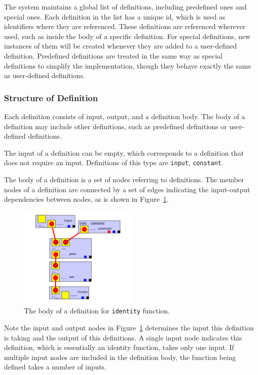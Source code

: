 \documentclass[12pt,UTF8,a4]{article}
\begin{document}
The system maintains a global list of definitions, including predefined ones and special ones. Each definition in the list has a unique id, which is used as identifiers where they are referenced. These definitions are referenced wherever used, such as inside the body of a specific definition. For special definitions, new instances of them will be created whenever they are added to a user-defined definition. Predefined definitions are treated in the same way as special definitions to simplify the implementation, though they behave exactly the same as user-defined definitions.

\subsubsection{Structure of Definition}
Each definition consists of input, output, and a definition body. The body of a definition may include other definitions, such as predefined definitions or user-defined definitions.

The input of a definition can be empty, which corresponds to a definition that does not require an input. Definitions of this type are \texttt{input}, \texttt{constant}.

The body of a definition is a set of nodes referring to definitions. The member nodes of a definition are connected by a set of edges indicating the input-output dependencies between nodes, as is shown in Figure~\ref{fig:defbody}.

\begin{figure}[h]
\center
\includegraphics[width=0.5\textwidth]{./images/defbody.png}
\caption{The body of a definition for \texttt{identity} function.}\label{fig:defbody}
\end{figure}

Note the input and output nodes in Figure~\ref{fig:defbody} determines the input this definition is taking and the output of this definitions. A single input node indicates this definition, which is essentially an identity function, takes only one input. If multiple input nodes are included in the definition body, the function being defined takes a number of inputs.
\end{document}
